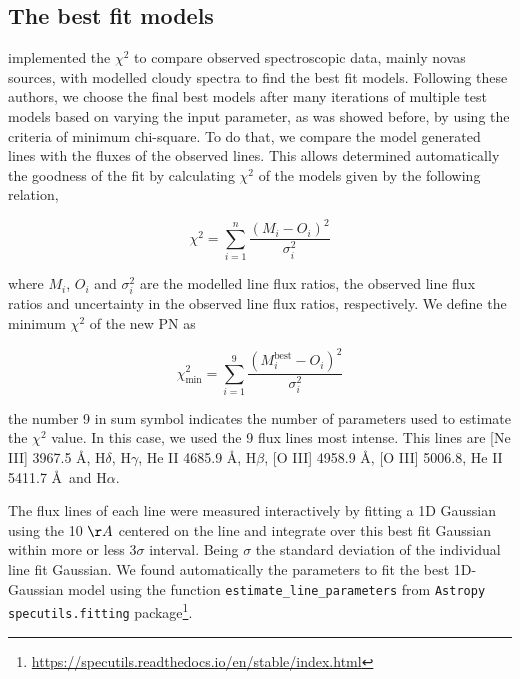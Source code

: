 \documentclass[fleqn,usenatbib]{mnras}
\begin{document}
\subsection{The best fit models}
\label{sec:best-fit}

\citet{Helton:2010, Mondal:2018, Pavana:2019, Mondal:2020, Pandey:2022a, Pandey:2022b}
implemented the $\chi^2$ to compare observed spectroscopic data,
mainly novas sources, with modelled {\sc cloudy} spectra to find the best
fit models. Following these authors, we choose the final best models
after many iterations of multiple test models based on varying the input parameter,
as was showed before, by using the criteria of minimum chi-square.
To do that, we compare the model generated lines with the fluxes of the observed lines.
This allows determined automatically the goodness of the fit by
calculating $\chi^{2}$ of the models given by the following relation,

\begin{equation}
  \chi^{2} = \sum^{n}_{i = 1} \frac{(M_i - O_i)^2}{\sigma^{2}_i}
  \label{eq:chi}
\end{equation}

where $M_i$, $O_i$ and $\sigma^{2}_i$ are the modelled line flux ratios, the observed line flux
ratios and uncertainty in the observed line flux ratios, respectively. We define the minimum
$\chi^{2}$ of the new PN as

\begin{equation}
   \chi^{2}_{\text{min}} = \sum^{9}_{i = 1} \frac{(M^{\text{best}}_i - O_i)^2}{\sigma^{2}_i}
  \label{eq:chi-red}
\end{equation}

the number 9 in sum symbol indicates the number of parameters used to estimate the  $\chi^{2}$
value. In this case, we used the 9 flux lines most intense.
This lines are [Ne III] 3967.5 \AA, H$\delta$, H$\gamma$, He II 4685.9 \AA, H$\beta$, [O III] 4958.9 \AA, [O III] 5006.8, He II 5411.7 \AA~and H{$\alpha$}.

The flux lines of each line were measured  interactively by fitting a 1D Gaussian using
the 10 $\AA$ centered on the line and integrate over this best fit Gaussian within more
or less 3$\sigma$ interval. Being $\sigma$ the standard deviation of the individual
line fit Gaussian. We found automatically the parameters to fit the best 1D-Gaussian model
using the function \texttt{estimate\_line\_parameters} from \texttt{Astropy specutils.fitting}
package\footnote{\url{https://specutils.readthedocs.io/en/stable/index.html}}.
\end{document}
